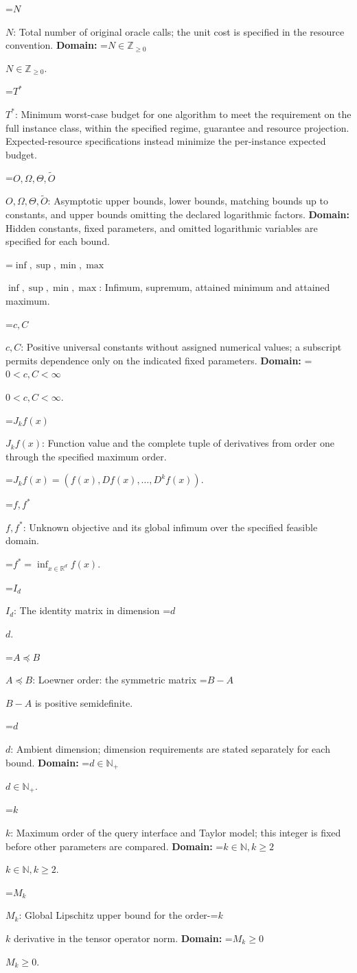 \documentclass[10pt,a4paper]{article}
\newcommand{\AtlasMath}[1]{\par\begingroup\centering\setbox0=\hbox{$\displaystyle #1$}\ifdim\wd0>1.4\linewidth\typeout{ATLAS WIDE FORMULA: \the\wd0}\fi\ifdim\wd0>\linewidth\resizebox{\linewidth}{!}{\box0}\else\box0\fi\par\endgroup}
\newcommand{\AtlasInlineMath}[1]{\begingroup\setbox0=\hbox{$#1$}\ifdim\wd0>.4\linewidth\endgroup\AtlasMath{#1}\else\endgroup$#1$\fi}
\begin{document}
\AtlasInlineMath{N}: Total number of original oracle calls; the unit cost is specified in the resource convention. \textbf{Domain:} \AtlasInlineMath{N\in\mathbb{Z}_{\ge0}}.

\AtlasInlineMath{T^*}: Minimum worst-case budget for one algorithm to meet the requirement on the full instance class, within the specified regime, guarantee and resource projection. Expected-resource specifications instead minimize the per-instance expected budget.

\AtlasInlineMath{O,\Omega,\Theta,\widetilde{O}}: Asymptotic upper bounds, lower bounds, matching bounds up to constants, and upper bounds omitting the declared logarithmic factors. \textbf{Domain:} Hidden constants, fixed parameters, and omitted logarithmic variables are specified for each bound.

\AtlasInlineMath{\inf,\sup,\min,\max}: Infimum, supremum, attained minimum and attained maximum.

\AtlasInlineMath{c,C}: Positive universal constants without assigned numerical values; a subscript permits dependence only on the indicated fixed parameters. \textbf{Domain:} \AtlasInlineMath{0<c,C<\infty}.

\AtlasInlineMath{J_{k}f(x)}: Function value and the complete tuple of derivatives from order one through the specified maximum order.


\AtlasMath{J_{k}f(x)=(f(x),Df(x),\ldots,D^{k}f(x)).}


\AtlasInlineMath{f,f^*}: Unknown objective and its global infimum over the specified feasible domain.


\AtlasMath{f^*=\inf_{x\in \mathbb{R}^d}f(x).}


\AtlasInlineMath{I_d}: The identity matrix in dimension \AtlasInlineMath{d}.

\AtlasInlineMath{A\preceq B}: Loewner order: the symmetric matrix \AtlasInlineMath{B-A} is positive semidefinite.

\AtlasInlineMath{d}: Ambient dimension; dimension requirements are stated separately for each bound. \textbf{Domain:} \AtlasInlineMath{d\in\mathbb{N}_{+}}.

\AtlasInlineMath{k}: Maximum order of the query interface and Taylor model; this integer is fixed before other parameters are compared. \textbf{Domain:} \AtlasInlineMath{k\in\mathbb{N}, k\ge2}.

\AtlasInlineMath{M_k}: Global Lipschitz upper bound for the order-\AtlasInlineMath{k} derivative in the tensor operator norm. \textbf{Domain:} \AtlasInlineMath{M_k\ge0}.
\end{document}
